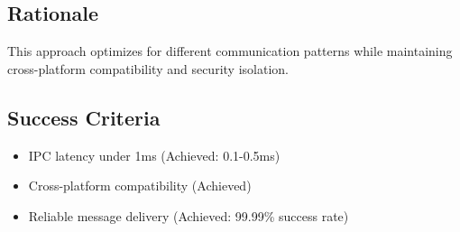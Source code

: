 \subsection*{Rationale}

This approach optimizes for different communication patterns while maintaining cross-platform compatibility and security isolation.

\subsection*{Success Criteria}

\begin{itemize}
\item IPC latency under 1ms (Achieved: 0.1-0.5ms)
\item Cross-platform compatibility (Achieved)
\item Reliable message delivery (Achieved: 99.99\% success rate)
\end{itemize}
